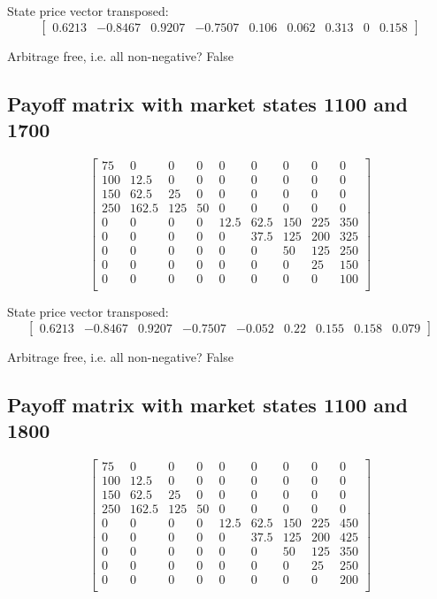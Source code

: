 \documentclass{article}
\begin{document}
State price vector transposed: \[
    \begin{bmatrix} 0.6213 & -0.8467 & 0.9207 & -0.7507 & 0.106 & 0.062 & 0.313 & 0& 0.158 \end{bmatrix}
\]

Arbitrage free, i.e. all non-negative? False

\subsection{Payoff matrix with market states 1100 and 1700}
\[
    \begin{bmatrix}
        75  & 0     & 0   & 0  & 0    & 0    & 0   & 0   & 0   \\
        100 & 12.5  & 0   & 0  & 0    & 0    & 0   & 0   & 0   \\
        150 & 62.5  & 25  & 0  & 0    & 0    & 0   & 0   & 0   \\
        250 & 162.5 & 125 & 50 & 0    & 0    & 0   & 0   & 0   \\
        0   & 0     & 0   & 0  & 12.5 & 62.5 & 150 & 225 & 350 \\
        0   & 0     & 0   & 0  & 0    & 37.5 & 125 & 200 & 325 \\
        0   & 0     & 0   & 0  & 0    & 0    & 50  & 125 & 250 \\
        0   & 0     & 0   & 0  & 0    & 0    & 0   & 25  & 150 \\
        0   & 0     & 0   & 0  & 0    & 0    & 0   & 0   & 100 \\
    \end{bmatrix}
\]

State price vector transposed: \[
    \begin{bmatrix} 0.6213 & -0.8467 & 0.9207 & -0.7507 & -0.052 & 0.22 & 0.155 & 0.158 & 0.079 \end{bmatrix}
\]

Arbitrage free, i.e. all non-negative? False

\subsection{Payoff matrix with market states 1100 and 1800}
\[
    \begin{bmatrix}
        75  & 0     & 0   & 0  & 0    & 0    & 0   & 0   & 0   \\
        100 & 12.5  & 0   & 0  & 0    & 0    & 0   & 0   & 0   \\
        150 & 62.5  & 25  & 0  & 0    & 0    & 0   & 0   & 0   \\
        250 & 162.5 & 125 & 50 & 0    & 0    & 0   & 0   & 0   \\
        0   & 0     & 0   & 0  & 12.5 & 62.5 & 150 & 225 & 450 \\
        0   & 0     & 0   & 0  & 0    & 37.5 & 125 & 200 & 425 \\
        0   & 0     & 0   & 0  & 0    & 0    & 50  & 125 & 350 \\
        0   & 0     & 0   & 0  & 0    & 0    & 0   & 25  & 250 \\
        0   & 0     & 0   & 0  & 0    & 0    & 0   & 0   & 200 \\
    \end{bmatrix}
\]
\end{document}
